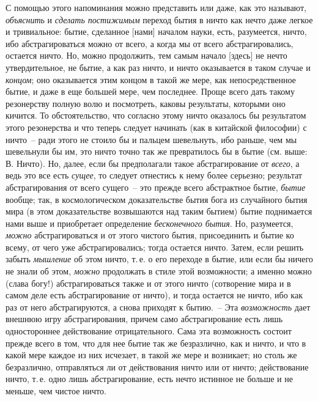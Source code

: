 С помощью этого напоминания можно представить
или даже, как это называют, \emph{объяснить}\endnotemark{} и \emph{сделать постижимым}
переход бытия в ничто как нечто даже легкое
и тривиальное: бытие, сделанное [нами] началом науки,
есть, разумеется, ничто, ибо абстрагироваться можно от
всего, а когда мы от всего абстрагировались, остается ничто.
Но, можно продолжить, тем самым начало [здесь] не
нечто утвердительное, не бытие, а как раз ничто, и ничто
оказывается в таком случае и \emph{концом}; оно оказывается
этим концом в такой же мере, как непосредственное бытие,
и даже в еще большей мере, чем последнее. Проще
всего дать такому резонерству полную волю и посмотреть,
каковы результаты, которыми оно кичится. То обстоятельство,
что согласно этому ничто оказалось бы результатом
этого резонерства и что теперь следует начинать (как в
китайской философии) с ничто~-- ради этого не стоило бы
и пальцем шевельнуть, ибо раньше, чем мы шевельнули
бы им, это ничто точно так же превратилось бы в бытие
(см. выше: В. Ничто). Но, далее, если бы предполагали
такое абстрагирование от \emph{всего}, а ведь это все есть \emph{сущее},
то следует отнестись к нему более серьезно; результат
абстрагирования от всего сущего~-- это прежде всего абстрактное
бытие, \emph{бытие} вообще; так, в космологическом
доказательстве бытия бога из случайного бытия мира
(в этом доказательстве возвышаются над таким бытием)
бытие поднимается нами выше и приобретает определение
\emph{бесконечного бытия}. Но, разумеется, \emph{можно} абстрагироваться
и от этого чистого бытия, присоединить и бытие
ко всему, от чего уже абстрагировались; тогда остается
ничто. Затем, если решить забыть \emph{мышление} об этом ничто,
т.\,е. о его переходе в бытие, или если бы ничего не
знали об этом, \emph{можно} продолжать в стиле этой возможности;
а именно можно (слава богу!) абстрагироваться также
и от этого ничто (сотворение мира и в самом деле есть
абстрагирование от ничто), и тогда остается не ничто,
ибо как раз от него абстрагируются, а снова приходят к
бытию.~-- Эта \emph{возможность} дает внешнюю игру абстрагирования,
причем само абстрагирование есть лишь одностороннее
действование отрицательного. Сама эта возможность
состоит прежде всего в том, что для нее бытие так
же безразлично, как и ничто, и что в какой мере каждое
из них исчезает, в такой же мере и возникает; но столь
же безразлично, отправляться ли от действования ничто
или от ничто; действование ничто, т.\,е. одно лишь абстрагирование,
есть нечто истинное не больше и не меньше,
чем чистое ничто.


